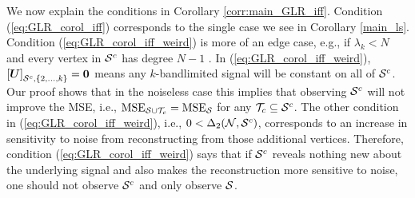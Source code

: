 We now explain the conditions in Corollary \ref{corr:main_GLR_iff}. Condition (\ref{eq:GLR_corol_iff}) corresponds to the single case we see in Corollary \ref{main_ls}. Condition (\ref{eq:GLR_corol_iff_weird}) is more of an edge case,  e.g., if $\lambda_{k} < N$ and every vertex in $\mathcal{S}^{c}$ has degree $N-1$ \cite[Corollary 2.3]{merris1998laplacian}. In (\ref{eq:GLR_corol_iff_weird}), $\msubgen[\set{S}^{c}, \{2,\ldots,k\}]{\matr{U}} = \vect{0}$ means any $k$-bandlimited signal will be constant on all of $\mathcal{S}^{c}$. Our proof shows that in the noiseless case this implies that observing $\mathcal{S}^{c}$ will not improve the MSE, i.e., $\text{MSE}_{\mathcal{S} \cup \mathcal{T}_{c}} = \text{MSE}_{\mathcal{S}}$ for any $\mathcal{T}_{c} \subseteq \mathcal{S}^{c}$. %
The other condition in (\ref{eq:GLR_corol_iff_weird}), i.e., $0 < \Delta_2(\mathcal{N},\mathcal{S}^{c})$, corresponds to an increase in sensitivity to noise from reconstructing from those additional vertices. Therefore, condition (\ref{eq:GLR_corol_iff_weird}) says that if $\mathcal{S}^{c}$ reveals nothing new about the underlying signal and also makes the reconstruction more sensitive to noise, one should not observe $\mathcal{S}^{c}$ and only observe $\mathcal{S}$.



